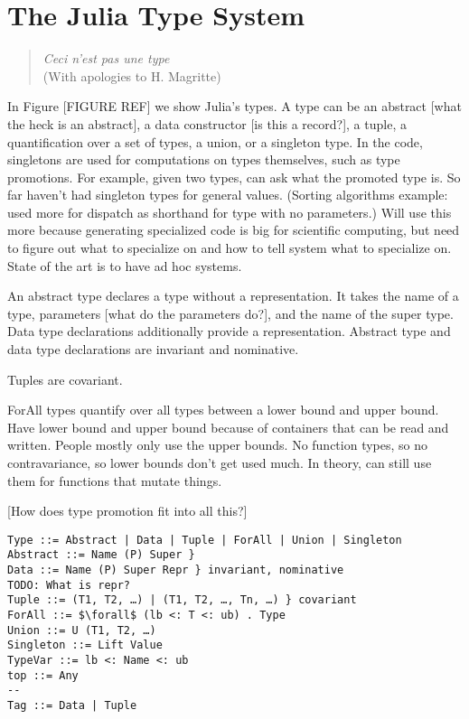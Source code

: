 \section{The Julia Type System}

\begin{quote}
  \textit{Ceci n'est pas une type} \\
  (With apologies to H. Magritte)
\end{quote}

In Figure [FIGURE REF] we show Julia's types. A type can be an abstract [what the heck is an abstract], a data constructor [is this a record?], a tuple, a quantification over a set of types, a union, or a singleton type. In the code, singletons are used for computations on types themselves, such as type promotions. For example, given two types, can ask what the promoted type is. So far haven't had singleton types for general values. (Sorting algorithms example: used more for dispatch as shorthand for type with no parameters.) Will use this more because generating specialized code is big for scientific computing, but need to figure out what to specialize on and how to tell system what to specialize on. State of the art is to have ad hoc systems.

An abstract type declares a type without a representation. It takes the name of a type, parameters [what do the parameters do?], and the name of the super type. Data type declarations additionally provide a representation. 
Abstract type and data type declarations are invariant and nominative.

Tuples are covariant.

ForAll types quantify over all types between a lower bound and upper bound. Have lower bound and upper bound because of containers that can be read and written. People mostly only use the upper bounds. No function types, so no contravariance, so lower bounds don't get used much. In theory, can still use them for functions that mutate things.

[How does type promotion fit into all this?]

\begin{verbatim}
Type ::= Abstract | Data | Tuple | ForAll | Union | Singleton
Abstract ::= Name (P) Super }
Data ::= Name (P) Super Repr } invariant, nominative
TODO: What is repr?
Tuple ::= (T1, T2, …) | (T1, T2, …, Tn, …) } covariant
ForAll ::= $\forall$ (lb <: T <: ub) . Type
Union ::= U (T1, T2, …)
Singleton ::= Lift Value
TypeVar ::= lb <: Name <: ub
top ::= Any
--
Tag ::= Data | Tuple
\end{verbatim}

